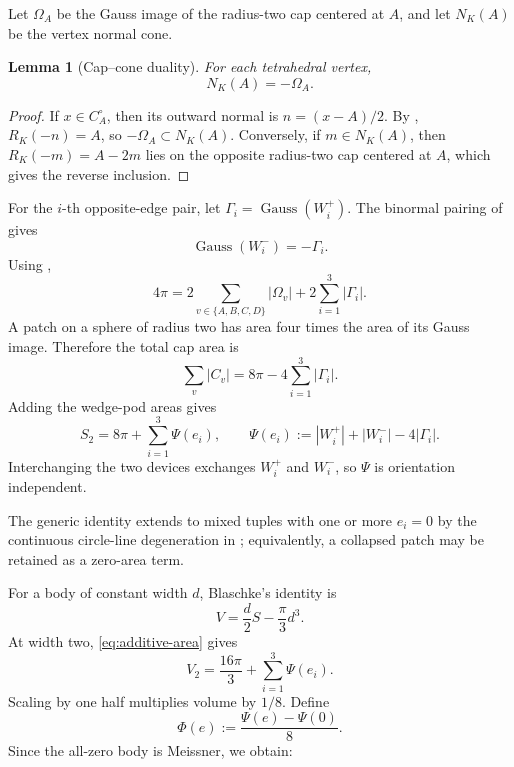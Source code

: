 \documentclass[11pt]{article}
\numberwithin{equation}{section}
\newtheorem{lemma}[theorem]{Lemma}
\theoremstyle{remark}
\newcommand{\Gauss}{\operatorname{Gauss}}
\begin{document}
Let \(\Omega_A\) be the Gauss image of the radius-two cap centered at \(A\), and let \(N_K(A)\) be the vertex normal cone.

\begin{lemma}[Cap--cone duality]
\label{lem:cap-cone}
For each tetrahedral vertex,
\begin{equation}
  N_K(A)=-\Omega_A.
  \label{eq:cap-cone}
\end{equation}
\end{lemma}

\begin{proof}
If \(x\in C_A^\circ\), then its outward normal is \(n=(x-A)/2\).  By , \(R_K(-n)=A\), so \(-\Omega_A\subset N_K(A)\).  Conversely, if \(m\in N_K(A)\), then \(R_K(-m)=A-2m\) lies on the opposite radius-two cap centered at \(A\), which gives the reverse inclusion.
\end{proof}

For the \(i\)-th opposite-edge pair, let \(\Gamma_i=\Gauss(W_i^+)\).  The binormal pairing of \cite[Lemma~3.8]{ArelioMontejanoOliveros2023} gives
\[
  \Gauss(W_i^-)=-\Gamma_i.
\]
Using ,
\begin{equation}
  4\pi
  =2\sum_{v\in\{A,B,C,D\}}|\Omega_v|
   +2\sum_{i=1}^3|\Gamma_i|.
  \label{eq:normal-partition}
\end{equation}
A patch on a sphere of radius two has area four times the area of its Gauss image.  Therefore the total cap area is
\begin{equation}
  \sum_v|C_v|=8\pi-4\sum_{i=1}^3|\Gamma_i|.
  \label{eq:cap-elimination}
\end{equation}
Adding the wedge-pod areas gives
\begin{equation}
  S_2=8\pi+\sum_{i=1}^3\Psi(e_i),
  \qquad
  \Psi(e_i):=|W_i^+|+|W_i^-|-4|\Gamma_i|.
  \label{eq:additive-area}
\end{equation}
Interchanging the two devices exchanges \(W_i^+\) and \(W_i^-\), so \(\Psi\) is orientation independent.

The generic identity extends to mixed tuples with one or more \(e_i=0\) by the continuous circle-line degeneration in \cite[Section~5.3]{ArelioMontejanoOliveros2023}; equivalently, a collapsed patch may be retained as a zero-area term.

For a body of constant width \(d\), Blaschke's identity is
\begin{equation}
  V=\frac d2S-\frac\pi3d^3.
  \label{eq:blaschke}
\end{equation}
At width two, \eqref{eq:additive-area} gives
\[
  V_2=\frac{16\pi}{3}+\sum_{i=1}^3\Psi(e_i).
\]
Scaling by one half multiplies volume by \(1/8\).  Define
\begin{equation}
  \Phi(e):=\frac{\Psi(e)-\Psi(0)}8.
  \label{eq:phi-def}
\end{equation}
Since the all-zero body is Meissner, we obtain:
\end{document}

